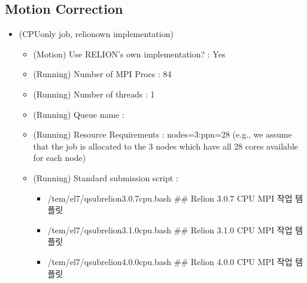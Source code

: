 \documentclass[a4paper,11pt,english]{sphinxmanual}
\begin{document}
\subsection{Motion Correction}
\label{\detokenize{relion:motion-correction}}\begin{itemize}
\item {} 
\sphinxAtStartPar
{} (CPU\sphinxhyphen{}only job, relion\sphinxhyphen{}own implementation)
\begin{itemize}
\item {} 
\sphinxAtStartPar
(Motion) Use RELION’s own implementation? : Yes

\item {} 
\sphinxAtStartPar
(Running) Number of MPI Procs : 84

\item {} 
\sphinxAtStartPar
(Running) Number of threads : 1

\item {} 
\sphinxAtStartPar
(Running) Queue name : 

\item {} 
\sphinxAtStartPar
(Running) Resource Requirements : nodes=3:ppn=28  (e.g., we assume that the job is allocated to the 3 nodes which have all 28 cores available for each node)

\item {} 
\sphinxAtStartPar
(Running) Standard submission script :
\begin{itemize}
\item {} 
\sphinxAtStartPar
/tem/el7/qsub\sphinxhyphen{}relion\sphinxhyphen{}3.0.7\sphinxhyphen{}cpu.bash           \#\# Relion 3.0.7 CPU MPI 작업 템플릿

\item {} 
\sphinxAtStartPar
/tem/el7/qsub\sphinxhyphen{}relion\sphinxhyphen{}3.1.0\sphinxhyphen{}cpu.bash           \#\# Relion 3.1.0 CPU MPI 작업 템플릿

\item {} 
\sphinxAtStartPar
/tem/el7/qsub\sphinxhyphen{}relion\sphinxhyphen{}4.0.0\sphinxhyphen{}cpu.bash           \#\# Relion 4.0.0 CPU MPI 작업 템플릿

\end{itemize}

\end{itemize}

\end{itemize}

\end{document}
